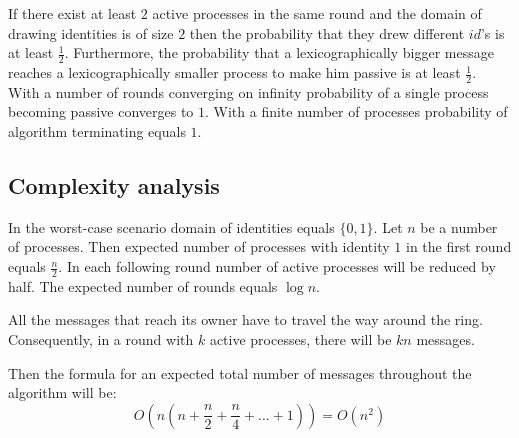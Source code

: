 \documentclass{article}
\begin{document}
If there exist at least $2$ active processes in the same round and the domain of drawing identities is of size $2$ then the probability that they drew different $id$'s is at least $\frac{1}{2}$. Furthermore, the probability that a lexicographically bigger message reaches a lexicographically smaller process to make him passive is at least $\frac{1}{2}$. With a number of rounds converging on infinity probability of a single process becoming passive converges to $1$. With a finite number of processes probability of algorithm terminating equals $1$.

\subsection*{Complexity analysis}

In the worst-case scenario domain of identities equals $\{0,1\}$. Let $n$ be a number of processes. Then expected number of processes with identity $1$ in the first round equals $\frac{n}{2}$. In each following round number of active processes will be reduced by half. The expected number of rounds equals $\log n$.

All the messages that reach its owner have to travel the way around the ring. Consequently, in a round with $k$ active processes, there will be $kn$ messages. 

Then the formula for an expected total number of messages throughout the algorithm will be:
$$
O\left(n\left(n + \frac{n}{2} + \frac{n}{4} + \ldots + 1 \right)\right) = O(n^2)
$$

\printbibliography
\end{document}
